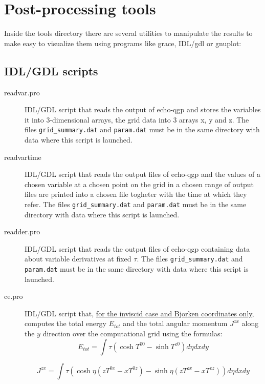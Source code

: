 \chapter{Post-processing tools}\label{tools}
Inside the tools directory there are several utilities to manipulate the results to make easy to visualize them using programs like grace, IDL/gdl or gnuplot:\\
\section{IDL/GDL scripts}
\begin{description}
\item [readvar.pro] IDL/GDL script that reads the output of echo-qgp and stores the variables it into 3-dimensional arrays, the grid data into 3 arrays x, y and z. The files {\tt grid\_summary.dat} and {\tt param.dat} must be in the same directory with data where this script is launched. 

\item [readvartime] IDL/GDL script that reads the output files of echo-qgp and the values of a chosen variable at a chosen point on the grid in a chosen range of output files are printed into a chosen file togheter with the time at which they refer. The files {\tt grid\_summary.dat} and {\tt param.dat} must be in the same directory with data where this script is launched.
\item [readder.pro] IDL/GDL script that reads the output files of echo-qgp containing data about variable derivatives at fixed $\tau$. The files {\tt grid\_summary.dat} and {\tt param.dat} must be in the same directory with data where this script is launched.

\item[ce.pro] IDL/GDL script that, \underline{for the inviscid case and Bjorken coordinates only}, computes the total energy $E_{tot}$ and the total angular momentum $J^{zx}$ along the $y$ direction over the computational grid using the formulas:
\begin{displaymath}
E_{tot}=\int \tau  ( \cosh T^{00} - \sinh T^{z0} ) d\eta dx dy
\end{displaymath}

\begin{displaymath}
J^{zx}=\int \tau ( \cosh \eta (zT^{0x}-xT^{0z}) - \sinh \eta (zT^{zx}-xT^{zz}) ) d\eta dx dy
\end{displaymath}


\end{description}
